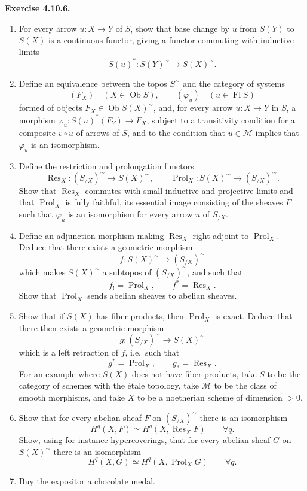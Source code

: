 \documentclass[11pt]{article}
\newcommand{\M}{\mathcal{M}}
\newcommand{\Ob}{\operatorname{Ob}}
\newcommand{\Fl}{\operatorname{Fl}}
\newcommand{\Res}{\operatorname{Res}}
\newcommand{\Prol}{\operatorname{Prol}}
\newcommand{\ie}{i.e.}
\newenvironment{remarktext}[1]{\par\medskip\noindent\textbf{#1.}\ }{\par\medskip}
\begin{document}
\begin{remarktext}{Exercise 4.10.6}
\begin{enumerate}[label=\arabic*)]
\item For every arrow \(u:X\to Y\) of \(S\), show that base change by \(u\) from \(S(Y)\) to \(S(X)\) is a continuous functor, giving a functor commuting with inductive limits
\[
S(u)^\ast:S(Y)^{\sim}\longrightarrow S(X)^{\sim}.
\]
\item Define an equivalence between the topos \(S^{\sim}\) and the category of systems
\[
(F_X)\quad(X\in\Ob S),
\qquad
(\varphi_u)\quad(u\in\Fl S)
\]
formed of objects \(F_X\in\Ob S(X)^{\sim}\), and, for every arrow \(u:X\to Y\) in \(S\), a morphism \(\varphi_u:S(u)^\ast(F_Y)\to F_X\), subject to a transitivity condition for a composite \(v\circ u\) of arrows of \(S\), and to the condition that \(u\in\M\) implies that \(\varphi_u\) is an isomorphism.
\item Define the restriction and prolongation functors
\[
\Res_X:(S_{/X})^{\sim}\longrightarrow S(X)^{\sim},
\qquad
\Prol_X:S(X)^{\sim}\longrightarrow(S_{/X})^{\sim}.
\]
Show that \(\Res_X\) commutes with small inductive and projective limits and that \(\Prol_X\) is fully faithful, its essential image consisting of the sheaves \(F\) such that \(\varphi_u\) is an isomorphism for every arrow \(u\) of \(S_{/X}\).
\item Define an adjunction morphism making \(\Res_X\) right adjoint to \(\Prol_X\). Deduce that there exists a geometric morphism
\[
f:S(X)^{\sim}\longrightarrow(S_{/X})^{\sim}
\]
which makes \(S(X)^{\sim}\) a subtopos of \((S_{/X})^{\sim}\), and such that
\[
f_!=\Prol_X,
\qquad
f^\ast=\Res_X.
\]
Show that \(\Prol_X\) sends abelian sheaves to abelian sheaves.
\item Show that if \(S(X)\) has fiber products, then \(\Prol_X\) is exact. Deduce that there then exists a geometric morphism
\[
g:(S_{/X})^{\sim}\longrightarrow S(X)^{\sim}
\]
which is a left retraction of \(f\), \ie\ such that
\[
g^\ast=\Prol_X,
\qquad
g_\ast=\Res_X.
\]
For an example where \(S(X)\) does not have fiber products, take \(S\) to be the category of schemes with the \'etale topology, take \(\M\) to be the class of smooth morphisms, and take \(X\) to be a noetherian scheme of dimension \(>0\).
\item Show that for every abelian sheaf \(F\) on \((S_{/X})^{\sim}\) there is an isomorphism
\[
H^q(X,F)\simeq H^q(X,\Res_XF)\qquad\forall q.
\]
Show, using for instance hypercoverings, that for every abelian sheaf \(G\) on \(S(X)^{\sim}\) there is an isomorphism
\[
H^q(X,G)\simeq H^q(X,\Prol_XG)\qquad\forall q.
\]
\item Buy the expositor a chocolate medal.
\end{enumerate}
\end{remarktext}
\end{document}
